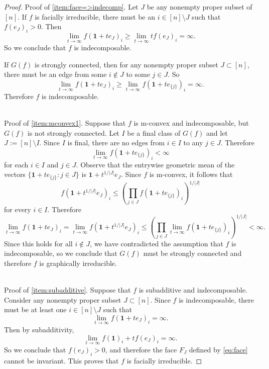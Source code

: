 \documentclass[10pt,reqno]{amsart}
\newcommand{\bs}{\setminus}
\theoremstyle{plain}
\theoremstyle{definition}
\numberwithin{equation}{section}
\begin{document}
\begin{proof}
Proof of \eqref{item:face=>indecomp}.  Let $J$ be any nonempty proper subset of $[n]$. If $f$ is facially irreducible, there must be an $i \in [n] \bs J$ such that $f(e_J)_i > 0$. Then 
$$\lim_{t \rightarrow \infty} f(\mathbf{1} + t e_J)_i \ge \lim_{t \rightarrow \infty} t f(e_J)_i = \infty.$$
So we conclude that $f$ is indecomposable.  

If $G(f)$ is strongly connected, then for any nonempty proper subset $J \subset [n]$, there must be an edge from some $i \notin J$ to some $j \in J$.  So 
$$\lim_{t \rightarrow \infty} f(\mathbf{1} + t e_J)_i \ge \lim_{t \rightarrow \infty} f(\mathbf{1} + t e_{\{j\}})_i = \infty.$$
Therefore $f$ is indecomposable. 

~\\
Proof of \eqref{item:mconvex1}. 
Suppose that $f$ is m-convex and indecomposable, but $G(f)$ is not strongly connected.  Let $I$ be a final class of $G(f)$ and let $J := [n] \bs I$.  Since $I$ is final, there are no edges from $i \in I$ to any $j \in J$.  Therefore 
$$\lim_{t \rightarrow \infty} f(\mathbf{1} + t e_{\{j\}})_i < \infty$$
for each $i \in I$ and $j \in J$.  
Observe that the entrywise geometric mean of the vectors $\{ \mathbf{1} + t e_{\{j\}} : j \in J\}$ is $\mathbf{1} + t^{1/|J|} e_J$. Since $f$ is m-convex, it follows that 
$$f(\mathbf{1} + t^{1/|J|} e_J)_i  \le \left( \prod_{j \in J} f(\mathbf{1} + t e_{\{j\}})_i \right)^{1/|J|}$$
for every $i \in I$. Therefore 
$$\lim_{t \rightarrow \infty} f(\mathbf{1} + t e_J)_i =\lim_{t \rightarrow \infty} f(\mathbf{1} + t^{1/|J|} e_J)_i  \le \left( \prod_{j \in J} \lim_{t \rightarrow \infty} f(\mathbf{1} + t e_{\{j\}})_i \right)^{1/|J|} < \infty.$$
Since this holds for all $i \notin J$, we have contradicted the assumption that $f$ is indecomposable, so we conclude that $G(f)$ must be strongly connected and therefore $f$ is graphically irreducible.  


~\\
Proof of \eqref{item:subadditive}.
Suppose that $f$ is subadditive and indecomposable.  Consider any nonempty proper subset $J \subset [n]$. 
Since $f$ is indecomposable, there must be at least one $i \in [n] \bs J$ such that 
$$\lim_{t \rightarrow \infty} f(\mathbf{1} + te_J)_i  = \infty.$$
Then by subadditivity, 
$$\lim_{t \rightarrow \infty} f(\mathbf{1})_i + tf(e_J)_i  = \infty.$$
So we conclude that $f(e_J)_i > 0$, and therefore the face $F_J$ defined by \eqref{eq:face} cannot be invariant.  This proves that $f$ is facially irreducible. %
\end{proof}
\end{document}
